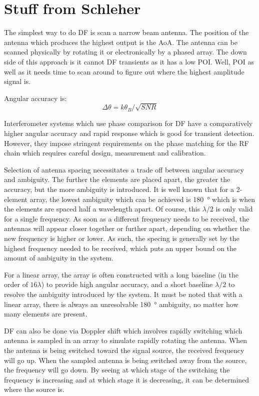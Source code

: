 \section{Stuff from Schleher}
The simplest way to do DF is scan a narrow beam antenna. The position of the antenna which produces the highest output is the AoA. The antenna can be scanned physically by rotating it or electronically by a phased array. 
The down side of this approach is it cannot DF transients as it has a low POI. Well, POI as well as it needs time to scan around to figure out where the highest amplitude signal is.

Angular accuracy is:
\begin{equation}
  \Delta \theta = k \theta_B / \sqrt{SNR}
\end{equation}

Interferometer systems which use phase comparison for DF have a comparatively higher angular accuracy and rapid response which is good for transient detection. However, they impose stringent requirements on the phase matching for the RF chain which requires careful design, measurement and calibration. 

Selection of antenna spacing necessitates a trade off between angular accuracy and ambiguity. The further the elements are placed apart, the greater the accuracy, but the more ambiguity is introduced. It is well known that for a 2-element array, the lowest ambiguity which can be achieved is \SI{180}{\degree} which is when the elements are spaced half a wavelength apart. 
Of course, this \(\lambda/2\) is only valid for a single frequency. As soon as a different frequency needs to be received, the antennas will appear closer together or further apart, depending on whether the new frequency is higher or lower. As such, the specing is generally set by the highest frequency needed to be received, which puts an upper bound on the amount of ambiguity in the system. 

For a linear array, the array is often constructed with a long baseline (in the order of \(16\lambda\)) to provide high angular accuracy, and a short baseline \(\lambda/2\) to resolve the ambiguity introduced by the system. It must be noted that with a linear array, there is always an unresolvable \SI{180}{\degree} ambiguity, no matter how many elements are present.

DF can also be done via Doppler shift which involves rapidly switching which antenna is sampled in an array to simulate rapidly rotating the antenna. When the antenna is being switched toward the signal source, the received frequency will go up. When the sampled antenna is being switched away from the source, the frequency will go down. By seeing at which stage of the switching the frequency is increasing and at which stage it is decreasing, it can be determined where the source is.


